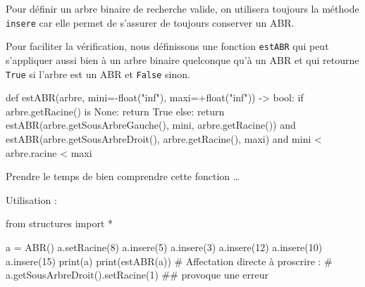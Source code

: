 \documentclass[
  letterpaper,
  DIV=11,
  numbers=noendperiod]{scrartcl}
\newenvironment{Shaded}{\begin{snugshade}}{\end{snugshade}}
\newcommand{\BuiltInTok}[1]{\textcolor[rgb]{0.00,0.23,0.31}{#1}}
\newcommand{\CommentTok}[1]{\textcolor[rgb]{0.37,0.37,0.37}{#1}}
\newcommand{\ControlFlowTok}[1]{\textcolor[rgb]{0.00,0.23,0.31}{#1}}
\newcommand{\DecValTok}[1]{\textcolor[rgb]{0.68,0.00,0.00}{#1}}
\newcommand{\ImportTok}[1]{\textcolor[rgb]{0.00,0.46,0.62}{#1}}
\newcommand{\KeywordTok}[1]{\textcolor[rgb]{0.00,0.23,0.31}{#1}}
\newcommand{\NormalTok}[1]{\textcolor[rgb]{0.00,0.23,0.31}{#1}}
\newcommand{\OperatorTok}[1]{\textcolor[rgb]{0.37,0.37,0.37}{#1}}
\newcommand{\StringTok}[1]{\textcolor[rgb]{0.13,0.47,0.30}{#1}}
\newcommand{\VariableTok}[1]{\textcolor[rgb]{0.07,0.07,0.07}{#1}}
\begin{document}
Pour définir un arbre binaire de recherche valide, on utilisera toujours
la méthode \texttt{insere} car elle permet de s'assurer de toujours
conserver un ABR.

Pour faciliter la vérification, nous définissons une fonction
\texttt{estABR} qui peut s'appliquer aussi bien à un arbre binaire
quelconque qu'à un ABR et qui retourne \texttt{True} si l'arbre est un
ABR et \texttt{False} sinon.

\begin{Shaded}
\begin{Highlighting}[]
\KeywordTok{def}\NormalTok{ estABR(arbre, mini}\OperatorTok{={-}}\BuiltInTok{float}\NormalTok{(}\StringTok{"inf"}\NormalTok{), maxi}\OperatorTok{=+}\BuiltInTok{float}\NormalTok{(}\StringTok{"inf"}\NormalTok{)) }\OperatorTok{{-}\textgreater{}} \BuiltInTok{bool}\NormalTok{:}
    \ControlFlowTok{if}\NormalTok{ arbre.getRacine() }\KeywordTok{is} \VariableTok{None}\NormalTok{:}
        \ControlFlowTok{return} \VariableTok{True}
    \ControlFlowTok{else}\NormalTok{:}
        \ControlFlowTok{return}\NormalTok{ estABR(arbre.getSousArbreGauche(), mini, arbre.getRacine()) }\KeywordTok{and} 
\NormalTok{               estABR(arbre.getSousArbreDroit(), arbre.getRacine(), maxi) }\KeywordTok{and} 
\NormalTok{               mini }\OperatorTok{\textless{}}\NormalTok{ arbre.racine }\OperatorTok{\textless{}}\NormalTok{ maxi}
\end{Highlighting}
\end{Shaded}

Prendre le temps de bien comprendre cette fonction \ldots{}

Utilisation :

\begin{Shaded}
\begin{Highlighting}[]
\ImportTok{from}\NormalTok{ structures }\ImportTok{import} \OperatorTok{*}

\NormalTok{a }\OperatorTok{=}\NormalTok{ ABR()}
\NormalTok{a.setRacine(}\DecValTok{8}\NormalTok{)}
\NormalTok{a.insere(}\DecValTok{5}\NormalTok{)}
\NormalTok{a.insere(}\DecValTok{3}\NormalTok{)}
\NormalTok{a.insere(}\DecValTok{12}\NormalTok{)}
\NormalTok{a.insere(}\DecValTok{10}\NormalTok{)}
\NormalTok{a.insere(}\DecValTok{15}\NormalTok{)}
\BuiltInTok{print}\NormalTok{(a)}
\BuiltInTok{print}\NormalTok{(estABR(a))}
\CommentTok{\# Affectation directe à proscrire :}
\CommentTok{\# a.getSousArbreDroit().setRacine(1) \#\# provoque une erreur}
\end{Highlighting}
\end{Shaded}
\end{document}
